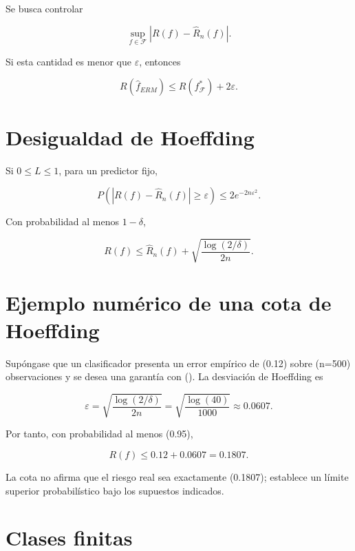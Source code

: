 \documentclass[
  spanish,
  10.5pt,
  letterpaper,
  DIV=11,
  numbers=noendperiod,
  oneside,
  open=any]{scrreprt}
\theoremstyle{definition}
\theoremstyle{definition}
\theoremstyle{plain}
\theoremstyle{remark}
\begin{document}

Se busca controlar

\[
\sup_{f\in\mathcal F}|R(f)-\widehat R_n(f)|.
\]

Si esta cantidad es menor que \(\varepsilon\), entonces

\[
R(\widehat f_{ERM})\le R(f^*_{\mathcal F})+2\varepsilon.
\]

\section*{Desigualdad de Hoeffding}\label{desigualdad-de-hoeffding}


Si \(0\le L\le1\), para un predictor fijo,

\[
P(|R(f)-\widehat R_n(f)|\ge\varepsilon)\le2e^{-2n\varepsilon^2}.
\]

Con probabilidad al menos \(1-\delta\),

\[
R(f)\le\widehat R_n(f)+\sqrt{\frac{\log(2/\delta)}{2n}}.
\]

\section*{Ejemplo numérico de una cota de
Hoeffding}\label{ejemplo-numuxe9rico-de-una-cota-de-hoeffding}


Supóngase que un clasificador presenta un error empírico de (0.12) sobre
(n=500) observaciones y se desea una garantía con (). La
desviación de Hoeffding es

\[
\varepsilon
=
\sqrt{
\frac{
\log(2/\delta)
}{
2n
}
}
=
\sqrt{
\frac{
\log(40)
}{
1000
}
}
\approx 0.0607.
\]

Por tanto, con probabilidad al menos (0.95),

\[
R(f)
\leq
0.12+0.0607
=
0.1807.
\]

La cota no afirma que el riesgo real sea exactamente (0.1807); establece
un límite superior probabilístico bajo los supuestos indicados.

\section*{Clases finitas}\label{clases-finitas}
\end{document}
